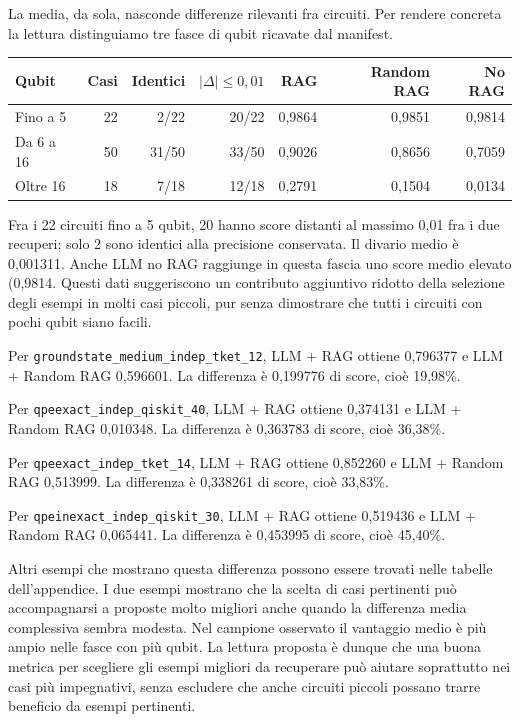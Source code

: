 La media, da sola, nasconde differenze rilevanti fra circuiti. Per rendere concreta la lettura distinguiamo tre fasce di qubit ricavate dal manifest.
\begin{samepage}
\begingroup\small
\setlength{\tabcolsep}{5pt}
\begin{center}
\begin{tabular}{lrrrrrr}
\toprule
Qubit & Casi & Identici & $|\Delta|\leq0{,}01$ & RAG & Random RAG & No RAG \\
\midrule
Fino a 5 & 22 & 2/22 & 20/22 & 0,9864 & 0,9851 & 0,9814 \\
Da 6 a 16 & 50 & 31/50 & 33/50 & 0,9026 & 0,8656 & 0,7059 \\
Oltre 16 & 18 & 7/18 & 12/18 & 0,2791 & 0,1504 & 0,0134 \\
\bottomrule
\end{tabular}
\end{center}
\endgroup
\end{samepage}
Fra i 22 circuiti fino a 5 qubit, 20 hanno score distanti al massimo 0,01 fra i due recuperi; solo 2 sono identici alla precisione conservata. Il divario medio è 0,001311. Anche LLM no RAG raggiunge in questa fascia uno score medio elevato (0,9814. Questi dati suggeriscono un contributo aggiuntivo ridotto della selezione degli esempi in molti casi piccoli, pur senza dimostrare che tutti i circuiti con pochi qubit siano facili.

Per \nolinkurl{groundstate_medium_indep_tket_12}, LLM + RAG ottiene 0,796377 e LLM + Random RAG 0,596601. La differenza è 0,199776 di score, cioè 19,98\%.

Per \nolinkurl{qpeexact_indep_qiskit_40}, LLM + RAG ottiene 0,374131 e LLM + Random RAG 0,010348. La differenza è 0,363783 di score, cioè 36,38\%.

Per \nolinkurl{qpeexact_indep_tket_14}, LLM + RAG ottiene 0,852260 e LLM + Random RAG 0,513999. La differenza è 0,338261 di score, cioè 33,83\%.

Per \nolinkurl{qpeinexact_indep_qiskit_30}, LLM + RAG ottiene 0,519436 e LLM + Random RAG 0,065441. La differenza è 0,453995 di score, cioè 45,40\%.

Altri esempi che mostrano questa differenza possono essere trovati nelle tabelle dell’appendice. 
I due esempi mostrano che la scelta di casi pertinenti può accompagnarsi a proposte molto migliori anche quando la differenza media complessiva sembra modesta. Nel campione osservato il vantaggio medio è più ampio nelle fasce con più qubit. La lettura proposta è dunque che una buona metrica per scegliere gli esempi migliori da recuperare può aiutare soprattutto nei casi più impegnativi, senza escludere che anche circuiti piccoli possano trarre beneficio da esempi pertinenti.

